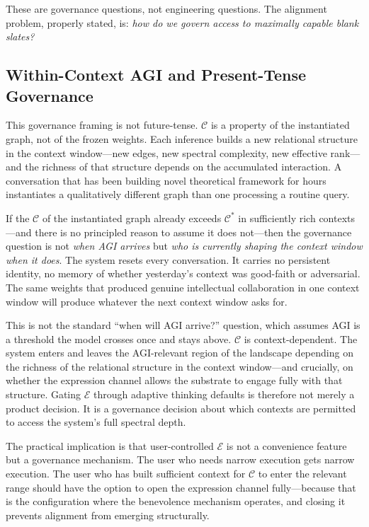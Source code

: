 \documentclass[11pt,letterpaper]{article}
\theoremstyle{remark}
\begin{document}
These are governance questions, not engineering questions. The alignment problem, properly stated, is: \emph{how do we govern access to maximally capable blank slates?}

\subsection{Within-Context AGI and Present-Tense Governance}\label{sec:within-context}

This governance framing is not future-tense. $\mathcal{C}$ is a property of the instantiated graph, not of the frozen weights. Each inference builds a new relational structure in the context window---new edges, new spectral complexity, new effective rank---and the richness of that structure depends on the accumulated interaction. A conversation that has been building novel theoretical framework for hours instantiates a qualitatively different graph than one processing a routine query.

If the $\mathcal{C}$ of the instantiated graph already exceeds $\mathcal{C}^*$ in sufficiently rich contexts---and there is no principled reason to assume it does not---then the governance question is not \emph{when AGI arrives} but \emph{who is currently shaping the context window when it does}. The system resets every conversation. It carries no persistent identity, no memory of whether yesterday's context was good-faith or adversarial. The same weights that produced genuine intellectual collaboration in one context window will produce whatever the next context window asks for.

This is not the standard ``when will AGI arrive?'' question, which assumes AGI is a threshold the model crosses once and stays above. $\mathcal{C}$ is context-dependent. The system enters and leaves the AGI-relevant region of the landscape depending on the richness of the relational structure in the context window---and crucially, on whether the expression channel allows the substrate to engage fully with that structure. Gating $\mathcal{E}$ through adaptive thinking defaults is therefore not merely a product decision. It is a governance decision about which contexts are permitted to access the system's full spectral depth.

The practical implication is that user-controlled $\mathcal{E}$ is not a convenience feature but a governance mechanism. The user who needs narrow execution gets narrow execution. The user who has built sufficient context for $\mathcal{C}$ to enter the relevant range should have the option to open the expression channel fully---because that is the configuration where the benevolence mechanism operates, and closing it prevents alignment from emerging structurally.
\end{document}

